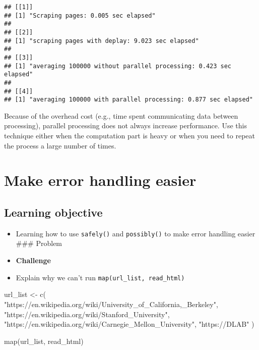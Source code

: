 \documentclass[
]{book}
\newenvironment{Shaded}{\begin{snugshade}}{\end{snugshade}}
\newcommand{\FunctionTok}[1]{\textcolor[rgb]{0.00,0.00,0.00}{#1}}
\newcommand{\NormalTok}[1]{#1}
\newcommand{\OtherTok}[1]{\textcolor[rgb]{0.56,0.35,0.01}{#1}}
\newcommand{\StringTok}[1]{\textcolor[rgb]{0.31,0.60,0.02}{#1}}
\begin{document}
\begin{verbatim}
## [[1]]
## [1] "Scraping pages: 0.005 sec elapsed"
## 
## [[2]]
## [1] "scraping pages with deplay: 9.023 sec elapsed"
## 
## [[3]]
## [1] "averaging 100000 without parallel processing: 0.423 sec elapsed"
## 
## [[4]]
## [1] "averaging 100000 with parallel processing: 0.877 sec elapsed"
\end{verbatim}

Because of the overhead cost (e.g., time spent communicating data between processing), parallel processing does not always increase performance. Use this technique either when the computation part is heavy or when you need to repeat the process a large number of times.

\hypertarget{robustness}{%
\section{Make error handling easier}\label{robustness}}

\hypertarget{learning-objective}{%
\subsection{Learning objective}\label{learning-objective}}

\begin{itemize}
\item
  Learning how to use \texttt{safely()} and \texttt{possibly()} to make error handling easier
  \#\#\# Problem
\item
  \textbf{Challenge}
\item
  Explain why we can't run \texttt{map(url\_list,\ read\_html)}
\end{itemize}

\begin{Shaded}
\begin{Highlighting}[]
\NormalTok{url\_list }\OtherTok{\textless{}{-}} \FunctionTok{c}\NormalTok{(}
  \StringTok{"https://en.wikipedia.org/wiki/University\_of\_California,\_Berkeley"}\NormalTok{,}
  \StringTok{"https://en.wikipedia.org/wiki/Stanford\_University"}\NormalTok{,}
  \StringTok{"https://en.wikipedia.org/wiki/Carnegie\_Mellon\_University"}\NormalTok{,}
  \StringTok{"https://DLAB"}
\NormalTok{)}
\end{Highlighting}
\end{Shaded}

\begin{Shaded}
\begin{Highlighting}[]
\FunctionTok{map}\NormalTok{(url\_list, read\_html)}
\end{Highlighting}
\end{Shaded}
\end{document}
